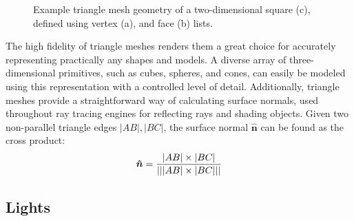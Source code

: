 \begin{figure}[!ht]
\begin{subfigure}{.35\textwidth}
        \caption{}
    \end{subfigure}

    \caption[Example triangle mesh geometry of a two-dimensional square]{
        Example triangle mesh geometry of a two-dimensional square (c), defined using vertex (a), and face (b) lists.}
    \label{fig:Implementation/SceneRepresentation/mesh}
\end{figure}

The high fidelity of triangle meshes renders them a great choice for accurately representing practically any shapes and models.
A diverse array of three-dimensional primitives, such as cubes, spheres, and cones, can easily be modeled using this representation with a controlled level of detail. 
Additionally, triangle meshes provide a straightforward way of calculating surface normals, used throughout ray tracing engines for reflecting rays and shading objects.
Given two non-parallel triangle edges $ |AB|, |BC| $, the surface normal $ \bm{\hat{n}} $ can be found as the cross product:
%
\begin{equation}
    \bm{\hat{n}} = \frac{|AB|\times|BC|}{\lvert\lvert |AB|\times|BC| \rvert\rvert}
\end{equation}

\subsection{Lights}

